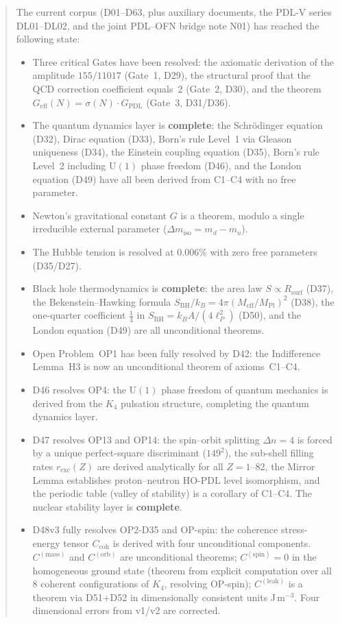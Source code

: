 \documentclass[11pt,a4paper]{article}
\theoremstyle{plain}
\theoremstyle{definition}
\theoremstyle{remark}
\newcommand{\Kfour}{K_4}
\newcommand{\Geff}{G_{\mathrm{eff}}}
\newcommand{\GPDL}{G_{\mathrm{PDL}}}
\newcommand{\Rsurf}{R_{\mathrm{surf}}}
\newcommand{\sigmaN}{\sigma(N)}
\newcommand{\SBH}{S_{\mathrm{BH}}}
\newcommand{\Meff}{M_{\mathrm{eff}}}
\newcommand{\MPl}{M_{\mathrm{Pl}}}
\newcommand{\Ccoh}{C_{\mathrm{coh}}}
\begin{document}
\begin{abstract}
The current corpus (D01--D63, plus auxiliary documents, the PDL-V series DL01--DL02, and the joint PDL--OFN bridge note N01) has reached the following state:
\begin{itemize}
\item Three critical Gates have been resolved: the axiomatic derivation of the amplitude $155/11017$ (Gate~1, D29), the structural proof that the QCD correction coefficient equals~2 (Gate~2, D30), and the theorem $\Geff(N)=\sigmaN\cdot\GPDL$ (Gate~3, D31/D36).
\item The quantum dynamics layer is \textbf{complete}: the Schr\"odinger equation (D32), Dirac equation (D33), Born's rule Level~1 via Gleason uniqueness (D34), the Einstein coupling equation (D35), Born's rule Level~2 including $\mathrm{U}(1)$ phase freedom (D46), and the London equation (D49) have all been derived from C1--C4 with no free parameter.
\item Newton's gravitational constant $G$ is a theorem, modulo a single irreducible external parameter ($\Delta m_{\mathrm{iso}} = m_d - m_u$).
\item The Hubble tension is resolved at $0.006\%$ with zero free parameters (D35/D27).
\item Black hole thermodynamics is \textbf{complete}: the area law $S \propto \Rsurf$ (D37), the Bekenstein--Hawking formula $\SBH/k_B = 4\pi(\Meff/\MPl)^2$ (D38), the one-quarter coefficient $\tfrac{1}{4}$ in $\SBH = k_B A/(4\ell_P^2)$ (D50), and the London equation (D49) are all unconditional theorems.
\item Open Problem~OP1 has been fully resolved by D42: the Indifference Lemma~H3 is now an unconditional theorem of axioms~C1--C4.
\item D46 resolves OP4: the $\mathrm{U}(1)$ phase freedom of quantum mechanics is derived from the $\Kfour$ pulsation structure, completing the quantum dynamics layer.
\item D47 resolves OP13 and OP14: the spin--orbit splitting $\Delta n = 4$ is forced by a unique perfect-square discriminant ($149^2$), the sub-shell filling rates $r_{\mathrm{exc}}(Z)$ are derived analytically for all $Z = 1$--82, the Mirror Lemma establishes proton--neutron HO-PDL level isomorphism, and the periodic table (valley of stability) is a corollary of C1--C4. The nuclear stability layer is \textbf{complete}.
\item D48v3 fully resolves OP2-D35 and OP-spin: the coherence stress-energy tensor $\Ccoh$ is derived with four unconditional components. $C^{(\mathrm{mass})}$ and $C^{(\mathrm{orb})}$ are unconditional theorems; $C^{(\mathrm{spin})}=0$ in the homogeneous ground state (theorem from explicit computation over all 8 coherent configurations of $K_4$, resolving OP-spin); $C^{(\mathrm{leak})}$ is a theorem via D51+D52 in dimensionally consistent units J\,m$^{-3}$. Four dimensional errors from v1/v2 are corrected.

\end{itemize}
\end{abstract}
\end{document}
